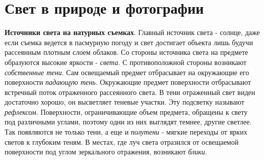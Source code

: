 \documentclass{article}
\begin{document}
\section{Свет в природе и фотографии}
\textbf{Источники света на натурных съемках}. Главный источник света - солнце, даже если съемка ведется в пасмурную погоду и свет достигает объекта лишь будучи рассеянным плотным слоем облаков. Со стороны источника света на предмете образуются высокие яркости - \textit{света}. С противоположной стороны возникают \textit{собственные тени}. Сам освещаемый предмет отбрасывает на окружающие его поверхности \textit{падающую тень}. Окружающие предмет поверхности отбрасывают встречный поток отраженного рассеянного света. В тени отраженный свет виден достаточно хорошо, он высветляет теневые участки. Эту подсветку называют \textit{рефлексом}. Поверхности, ограничивающие объем предмета, обращены к свету под различными углами, поэтому одни из них выглядят темнее, другие светлее. Так появляются не только тени, а еще и \textit{полутени} - мягкие переходы от ярких светов к глубоким теням. В местах, где луч света отразился от освещаемой поверхности под углом зеркального отражения, возникают \textit{блики}.
\end{document}
